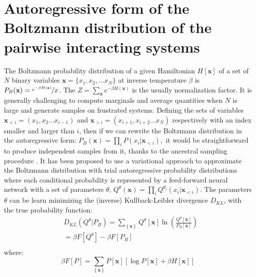 \documentclass[aps,physrev,10pt,floatfix,reprint]{revtex4-2}
\begin{document}
\section{Autoregressive form of the Boltzmann distribution of the pairwise interacting systems}
\label{sec:ARNN_boltzmann}
The Boltzmann probability distribution of a given Hamiltonian $H[\mathbf{x}]$ of a set of $N$ binary variables $\mathbf{x}=\{x_1, x_2,...x_N\}$ at inverse temperature $\beta$ is $P_{B}(\mathbf{x}) = \nicefrac{e^{-\beta H\left(\mathbf{x}\right)}}{Z}$. The $Z=\sum_{\mathbf{x}}e^{-\beta H\left(\mathbf{x}\right)}$ is the usually normalization factor.
It is generally challenging to compute marginals and average quantities when $N$ is large and generate samples on frustrated systems. Defining the sets of variables $\mathbf{x}_{<i}=\left(x_{1},x_{2}\dots x_{i-1}\right)$ and $\mathbf{x}_{>i}=\left(x_{i+1},x_{i+2}\dots x_{N}\right)$ respectively with an index smaller and larger than $i$, then if we can rewrite the Boltzmann distribution in the autoregressive form:
$
P_{B}\left(\mathbf{x}\right)=\prod_{i}P\left(x_{i}|\mathbf{x}_{<i}\right),
$
it would be straightforward to produce independent samples from it, thanks to the ancestral sampling procedure \cite{Wu2019}. It has been proposed \cite{Wu2019} to use a variational approach to approximate the Boltzmann distribution with trial autoregressive probability distributions where each conditional probability is represented by a feed-forward neural network with a set of parameters ${\theta}$,
$
Q^{\theta}\left(\mathbf{x}\right)=\prod_{i}Q^{\theta_i}\left(x_{i}|\mathbf{x}_{<i}\right)
$.
The parameters ${\theta}$ can be learn minimizing the (inverse) Kullback-Leibler divergence $D_{KL}$,
with the true probability function:
\begin{equation}
\begin{split}
& D_{KL}\left(Q^{\theta}| P_{B}\right) =  \sum_{\left\{ \mathbf{x} \right\} } Q^{\theta} [\mathbf{x}]\ln\left(\frac{Q^{\theta}[\mathbf{x}]}{P_{B}[\mathbf{x}]}\right)  \\
& = \beta F[Q^{\theta}] - \beta F[P_{B}]\\
\end{split}
\label{eq:kl}    
\end{equation}
where:
$$\beta F[P]= \sum_{\left\{ \mathbf{x} \right\}}P[\mathbf{x}]\left[\log P[\mathbf{x}] + \beta H[\mathbf{x}] \right] 
$$
\end{document}
